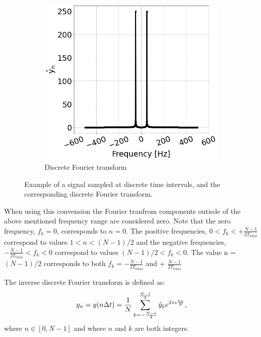 \begin{figure}[!ht]
\begin{subfigure}[t]{0.45\textwidth}
        \includegraphics[width=1\textwidth]{./images/app_B/simple_signal_1freq_fft_example.png}
        \caption{Discrete Fourier transform}
        \label{fig:signal_and_DFT_example_b}
    \end{subfigure}
    \hfill
     \caption{Example of a signal sampled at discrete time intervals, and the corresponding discrete Fourier transform.}
     \label{fig:signal_and_DFT_example}
\end{figure}

When using this convension the Fourier tranfrom components outisde of the above mentioned frequency range are considered zero. Note that the zero frequency, $f_k=0$, corresponds to $n=0$. The positive frequencies, $0  < f_k < + \frac{N-1}{2T_\mathrm{total}}$ correspond to values $1 < n < (N-1)/2$ and the negative frequencies,  $-\frac{N-1}{2T_\mathrm{total}}  < f_k < 0$ correspond to values $(N-1)/2 < f_k < 0$. The value n = $(N-1)/2$ corresponds to both $f_k = - \frac{N-1}{2T_\mathrm{total}}$ and + $\frac{N-1}{2T_\mathrm{total}}$


The inverse discrete Fourier transform is defined as:
\begin{equation}\label{eq:iDFT_definiton}
 y_n =  y(n\Delta t) = \frac{1}{N} \sum_{k=-\frac{N-1}{2}}^{\frac{N-1}{2}} \hat{y}_k e^{2\pi {i} \frac{k n}{N}},
\end{equation}
where $n \in \left[0,N-1 \right ]$ and where $n$ and $k$ are both integers.


